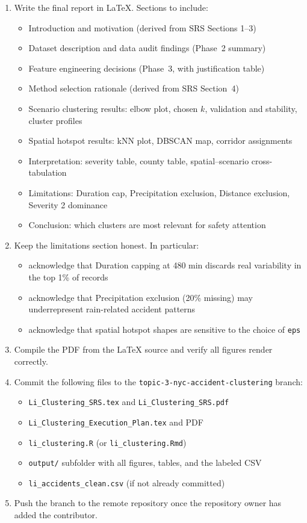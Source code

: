 \documentclass[11pt]{article}
\begin{document}
\begin{enumerate}
  \item Write the final report in LaTeX. Sections to include:
  \begin{itemize}
    \item Introduction and motivation (derived from SRS Sections 1--3)
    \item Dataset description and data audit findings (Phase~2 summary)
    \item Feature engineering decisions (Phase~3, with justification table)
    \item Method selection rationale (derived from SRS Section~4)
    \item Scenario clustering results: elbow plot, chosen $k$, validation and stability, cluster profiles
    \item Spatial hotspot results: kNN plot, DBSCAN map, corridor assignments
    \item Interpretation: severity table, county table, spatial--scenario cross-tabulation
    \item Limitations: Duration cap, Precipitation exclusion, Distance exclusion, Severity 2 dominance
    \item Conclusion: which clusters are most relevant for safety attention
  \end{itemize}

  \item Keep the limitations section honest. In particular:
  \begin{itemize}
    \item acknowledge that Duration capping at 480 min discards real variability in the top 1\% of records
    \item acknowledge that Precipitation exclusion (20\% missing) may underrepresent rain-related accident patterns
    \item acknowledge that spatial hotspot shapes are sensitive to the choice of \texttt{eps}
  \end{itemize}

  \item Compile the PDF from the LaTeX source and verify all figures render correctly.

  \item Commit the following files to the \texttt{topic-3-nyc-accident-clustering} branch:
  \begin{itemize}
    \item \texttt{Li\_Clustering\_SRS.tex} and \texttt{Li\_Clustering\_SRS.pdf}
    \item \texttt{Li\_Clustering\_Execution\_Plan.tex} and PDF
    \item \texttt{li\_clustering.R} (or \texttt{li\_clustering.Rmd})
    \item \texttt{output/} subfolder with all figures, tables, and the labeled CSV
    \item \texttt{li\_accidents\_clean.csv} (if not already committed)
  \end{itemize}

  \item Push the branch to the remote repository once the repository owner has added the contributor.
\end{enumerate}
\end{document}
